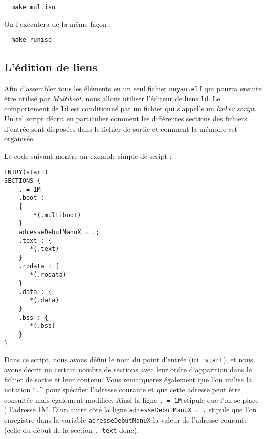 \begin{lstlisting}
  make multiso
\end{lstlisting}

On l'exécutera de la même façon :

\begin{lstlisting}
  make runiso
\end{lstlisting}
   
%
\subsection{L'édition de liens}

   Afin d'assembler tous les éléments en un seul fichier
\lstinline!noyau.elf! qui pourra ensuite être utilisé par {\em
  Multiboot}, nous allons utiliser l'éditeur de liens \lstinline!ld!.
Le comportement de \lstinline!ld! est conditionné par un fichier qui
s'appelle un {\em linker script}. Un tel script décrit en particulier
comment les différentes sections des fichiers d'entrée sont disposées
dans le fichier de sortie et comment la mémoire est organisée.


Le code suivant montre un exemple simple de script :

\begin{lstlisting}
ENTRY(start)
SECTIONS {
    . = 1M 
    .boot :
    {
        *(.multiboot)
    }
    adresseDebutManuX = .;
    .text : {
       *(.text)
    }        
    .rodata : {
       *(.rodata)
    }
    .data : {
       *(.data)
    }
    .bss : {
       *(.bss)
    }
}
\end{lstlisting}

   Dans ce script, nous avous défini le nom du point d'entrée (ici {\tt
  start}), et nous avons décrit un certain nombre de sections avec
leur ordre d'apparition dans le fichier de sortie et leur
contenu. Vous remarquerez également que l'on utilise la notation
``{\tt .}'' pour spécifier l'adresse courante et que cette adresse
peut être consultée mais également modifiée. Ainsi la ligne {\tt . =
  1M} stipule que l'on se place ) l'adresse 1M. D'un autre côté la
ligne {\tt adresseDebutManuX = .} stipule que l'on enregistre dans la
variable {\tt adresseDebutManuX} la valeur de l'adresse courante
(celle du début de la section {\tt . text} donc).


